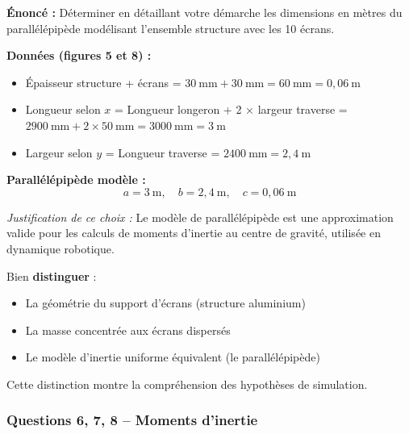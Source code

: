 \documentclass[12pt,a4paper,twoside]{article}
\begin{document}
\begin{correction}
  \textbf{Énoncé :} Déterminer en détaillant votre démarche les dimensions en mètres du parallélépipède modélisant l'ensemble structure avec les 10 écrans.

  \textbf{Données (figures 5 et 8) :}
  \begin{itemize}
    \item Épaisseur structure + écrans = $30~\text{mm} + 30~\text{mm} = 60~\text{mm} = 0,06~\text{m}$
    \item Longueur selon $x$ = Longueur longeron + 2 × largeur traverse = $2900~\text{mm} + 2 \times 50~\text{mm} = 3000~\text{mm} = 3~\text{m}$
    \item Largeur selon $y$ = Longueur traverse = $2400~\text{mm} = 2,4~\text{m}$
  \end{itemize}

  \textbf{Parallélépipède modèle :}
  \[
    \boxed{a = 3~\text{m}, \quad b = 2,4~\text{m}, \quad c = 0,06~\text{m}}
  \]

  \textit{Justification de ce choix :} Le modèle de parallélépipède est une approximation valide pour les calculs de moments d'inertie au centre de gravité, utilisée en dynamique robotique.
\end{correction}

\begin{astuce}
  Bien \textbf{distinguer} :
  \begin{itemize}
    \item La géométrie du support d'écrans (structure aluminium)
    \item La masse concentrée aux écrans dispersés
    \item Le modèle d'inertie uniforme équivalent (le parallélépipède)
  \end{itemize}
  Cette distinction montre la compréhension des hypothèses de simulation.
\end{astuce}

\subsubsection{Questions 6, 7, 8 -- Moments d'inertie}
\end{document}
